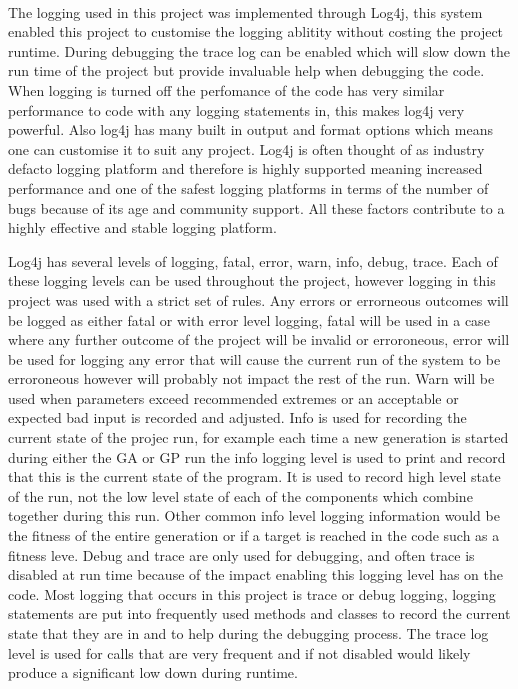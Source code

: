 \documentclass[12pt]{article}
\begin{document}
\paragraph{}

The logging used in this project was implemented through Log4j, this system enabled this project to customise the logging 
ablitity without costing the project runtime. During debugging the trace log can be enabled which will slow down the
run time of the project but provide invaluable help when debugging the code. When logging is turned off the perfomance
of the code has very similar performance to code with any logging statements in, this makes log4j very powerful. Also
log4j has many built in output and format options which means one can customise it to suit any project. Log4j is often
thought of as industry defacto logging platform and therefore is highly supported meaning increased performance
and one of the safest logging platforms in terms of the number of bugs because of its age and community support. All these
factors contribute to a highly effective and stable logging platform. 

Log4j has several levels of logging, fatal, error, warn, info, debug, trace. Each of these logging levels can be used throughout
the project, however logging in this project was used with a strict set of rules. Any errors or errorneous outcomes will 
be logged as either fatal or with error level logging, fatal will be used in a case where any further outcome of the project
will be invalid or erroroneous, error will be used for logging any error that will cause the current run of the system to be
erroroneous however will probably not impact the rest of the run. Warn will be used when parameters exceed recommended
extremes or an acceptable or expected bad input is recorded and adjusted. Info is used for recording the current state of
the projec run, for example each time a new generation is started during either the GA or GP run the info logging level is
used to print and record that this is the current state of the program. It is used to record high level state of the run,
not the low level state of each of the components which combine together during this run. Other common info level logging
information would be the fitness of the entire generation or if a target is reached in the code such as a fitness leve.
Debug and trace are only used for debugging, and often trace is disabled at run time because of the impact enabling this
logging level has on the code. Most logging that occurs in this project is trace or debug logging, logging statements are
put into frequently used methods and classes to record the current state that they are in and to help during the debugging
process. The trace log level is used for calls that are very frequent and if not disabled would likely produce a significant
low down during runtime. 
\end{document}
